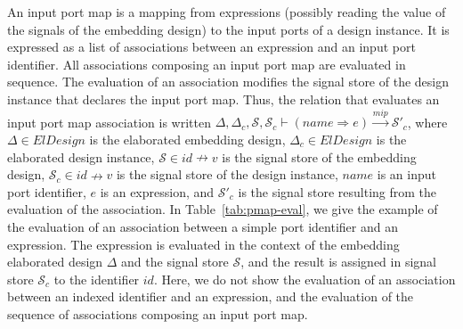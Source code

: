 \documentclass[pdflatex,sn-mathphys]{sn-jnl}%
\theoremstyle{thmstyleone}%
\theoremstyle{thmstyletwo}%
\theoremstyle{thmstylethree}%
\begin{document}
\begin{table}[!h]


\end{table}

An input port map is a mapping from expressions (possibly reading the
value of the signals of the embedding design) to the input ports of a
design instance. It is expressed as a list of associations between an
expression and an input port identifier.  All associations composing
an input port map are evaluated in sequence.  The evaluation of an
association modifies the signal store of the design instance that
declares the input port map. Thus, the relation that evaluates an
input port map association is written
$\Delta,\Delta_c,\mathcal{S},\mathcal{S}_c\vdash{}(name\Rightarrow{}e)\xrightarrow{mip}\mathcal{S}'_c$,
where $\Delta\in{}ElDesign$ is the elaborated embedding design,
$\Delta_c\in{}ElDesign$ is the elaborated design instance,
$\mathcal{S}\in{}id\nrightarrow{}v$ is the signal store of the
embedding design, $\mathcal{S}_c\in{}id\nrightarrow{}v$ is the signal
store of the design instance, $name$ is an input port identifier, $e$
is an expression, and $\mathcal{S}'_c$ is the signal store resulting
from the evaluation of the association. In Table~\ref{tab:pmap-eval},
we give the example of the evaluation of an association between a
simple port identifier and an expression. The expression is evaluated
in the context of the embedding elaborated design $\Delta$ and the
signal store $\mathcal{S}$, and the result is assigned in signal store
$\mathcal{S}_c$ to the identifier $id$. Here, we do not show the
evaluation of an association between an indexed identifier and an
expression, and the evaluation of the sequence of associations
composing an input port map.
\end{document}

